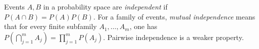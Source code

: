 
Events $A,B$ in a probability space are \emph{independent} if $P(A\cap B)=P(A)P(B)$. For a family of events, \emph{mutual independence} means that for every finite subfamily $A_1,\ldots,A_m$, one has $P(\bigcap_{j=1}^m A_j)=\prod_{j=1}^mP(A_j)$. Pairwise independence is a weaker property.
